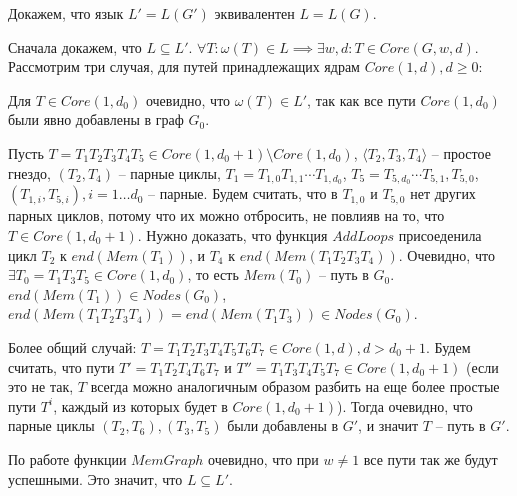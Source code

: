\documentclass{article}
\newenvironment{proof}[1][Доказательство]{\begin{trivlist}
\item[\hskip \labelsep {\bfseries #1}]}{\end{trivlist}}
\begin{document}
\begin{proof}
    Докажем, что язык $L' = L(G')$ эквивалентен $L = L(G)$.
    
    Сначала докажем, что $L \subseteq L'$.
    $\forall T : \omega(T) \in L \implies \exists w, d : T \in Core(G, w, d)$.
    Рассмотрим три случая, для путей принадлежащих ядрам $Core(1, d), d \geq 0$:

    Для $T \in Core(1, d_0)$ очевидно, что $\omega(T) \in L'$, так как все пути $Core(1, d_0)$ были явно добавлены в граф $G_0$.

    Пусть $T = T_1 T_2 T_3 T_4 T_5 \in Core(1, d_0 + 1) \setminus Core(1, d_0)$, 
    $\langle T_2, T_3, T_4 \rangle$ -- простое гнездо, $(T_2, T_4)$ -- парные циклы,
    $T_1 = T_{1, 0} T_{1, 1} \cdots T_{1, d_0}$,
    $T_5 = T_{5, d_0} \cdots T_{5, 1}, T_{5, 0}$,
    $(T_{1, i}, T_{5, i}), i = 1 \dots d_0$ -- парные.
    Будем считать, что в $T_{1,0}$ и $T_{5,0}$ нет других парных циклов,
    потому что их можно отбросить, не повлияв на то, что $T \in Core(1, d_0+1)$. 
    Нужно доказать, что функция $AddLoops$ присоеденила цикл $T_2$ к $end(Mem(T_1))$, 
    и $T_4$ к $end(Mem(T_1 T_2 T_3 T_4))$.
    Очевидно, что $\exists T_0 = T_1 T_3 T_5 \in Core(1, d_0)$, то есть $Mem(T_0)$ -- путь в $G_0$. 
    $end(Mem(T_1)) \in Nodes(G_0)$, $end(Mem(T_1 T_2 T_3 T_4)) = end(Mem(T_1 T_3)) \in Nodes(G_0)$.

    Более общий случай: $T = T_1 T_2 T_3 T_4 T_5 T_6 T_7\in Core(1, d), d > d_0 + 1$.
    Будем считать, что пути $T' = T_1 T_2 T_4 T_6 T_7$ и $T'' = T_1 T_3 T_4 T_5 T_7 \in Core(1, d_0+1)$
    (если это не так, $T$ всегда можно аналогичным образом разбить на еще более простые пути $T^i$,
    каждый из которых будет в $Core(1, d_0+1)$).
    Тогда очевидно, что парные циклы $(T_2,T_6), (T_3,T_5)$ были добавлены в $G'$, и значит $T$ -- путь в $G'$. 

    По работе функции $MemGraph$ очевидно, что при $w \neq 1$ все пути так же будут успешными.
    Это значит, что $L \subseteq L'$.


\end{proof}
\end{document}
